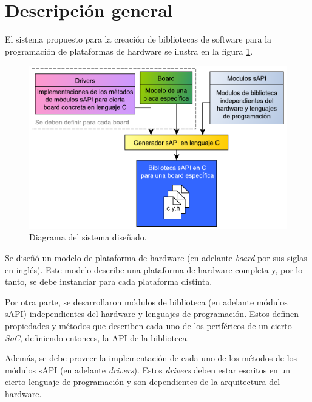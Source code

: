 \section{Descripción general}
\label{sec:descripGralDiseno}

El sistema propuesto para la creación de bibliotecas de software para la programación de plataformas de hardware se ilustra en la figura \ref{fig:sapi_gen}.

\begin{figure}[!htbp]
\begin{center}  %
\includegraphics*[width=14cm]{Figures/sapi_gen.pdf}
\par\caption{Diagrama del sistema diseñado.}\label{fig:sapi_gen}
\end{center}
\end{figure}

Se diseñó un modelo de plataforma de hardware (en adelante \emph{board} por sus siglas en inglés). Este modelo describe una plataforma de hardware completa y, por lo tanto, se debe instanciar para cada plataforma distinta.

Por otra parte, se desarrollaron módulos de biblioteca (en adelante módulos sAPI) independientes del hardware y lenguajes de programación. Estos definen propiedades y métodos que describen cada uno de los periféricos de un cierto \emph{SoC}, definiendo entonces, la API de la biblioteca.

Además, se debe proveer la implementación de cada uno de los métodos de los módulos sAPI (en adelante \emph{drivers}). Estos \emph{drivers} deben estar escritos en un cierto lenguaje de programación y son dependientes de la arquitectura del hardware.

